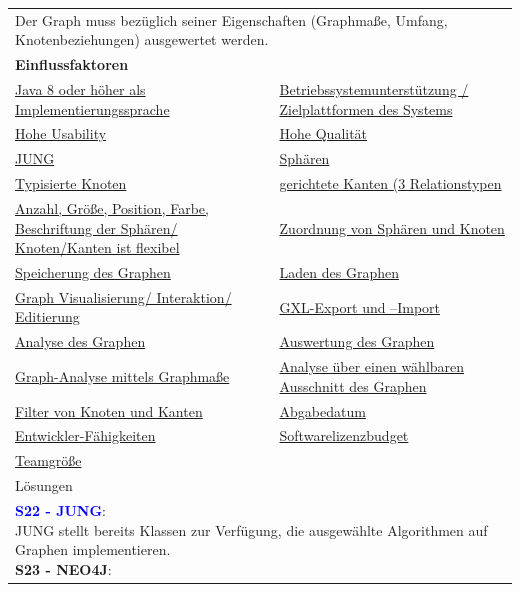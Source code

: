 \documentclass[enabledeprecatedfontcommands,fontsize=11pt,paper=a4,twoside]{scrartcl}
\newcommand{\cb}[1]{{\textcolor{blue}{#1}}}
\begin{document}
\newpage
\begin{tabular} {|p{8cm} p{8cm}|}
	\hline
	\rowcolor{prob}\multicolumn{2}{|l|}{\parbox{16cm}{\textbf{08: Auswertung von Grapheigenschaften}}} \\  \hline\hline 
	\multicolumn{2}{|l|}{\parbox{16cm}{Der Graph muss bezüglich seiner Eigenschaften (Graphmaße, Umfang, Knotenbeziehungen) ausgewertet werden.}}\rule{0pt}{4ex}\\ [1ex] \hline
	\multicolumn{2}{|l|}{\textbf{Einflussfaktoren}}\\
	\hyperlink{b}{Java 8 oder höher als Implementierungssprache} &
	\hyperlink {f}{Betriebssystemunterstützung / Zielplattformen des Systems}\\
	\hyperlink {g}{Hohe Usability}&
	\hyperlink {h}{Hohe Qualität}\\
	\hyperlink {k}{JUNG} &
	\hyperlink {n}{Sphären} \\
	\hyperlink {p}{Typisierte Knoten} &
	\hyperlink {q}{gerichtete Kanten (3 Relationstypen}\\
	\hyperlink {r}{Anzahl, Größe, Position, Farbe, Beschriftung der Sphären/ Knoten/Kanten ist flexibel} &
	\hyperlink {t}{Zuordnung von Sphären und Knoten} \\
	\hyperlink {v}{Speicherung des Graphen} &
	\hyperlink {w}{Laden des Graphen} \\
	\hyperlink {aa}{Graph Visualisierung/ Interaktion/ Editierung}&
	\hyperlink {jj}{GXL-Export und –Import} \\
	\hyperlink {oo}{Analyse des Graphen} &
	\hyperlink {pp}{Auswertung des Graphen} \\
	\hyperlink {qq}{Graph-Analyse mittels Graphmaße} &
	\hyperlink {rr}{Analyse über einen wählbaren Ausschnitt des Graphen} \\ 
	\hyperlink {ss}{Filter von Knoten und Kanten} &
	\hyperlink {uu}{Abgabedatum} \\
	\hyperlink {vv}{Entwickler-Fähigkeiten} &
	\hyperlink {ww}{Softwarelizenzbudget} \\
	\hyperlink {xx}{Teamgröße} &
	\\ \hline
	\multicolumn{2}{|l|}{Lösungen} \\
	\multicolumn{2}{|l|}{\parbox{16cm}{
			\textbf{\cb{\hypertarget{fff}{S22 - JUNG}}}: \\
			JUNG stellt bereits Klassen zur Verfügung, die ausgewählte Algorithmen auf Graphen implementieren. \\
			\textbf{S23 - NEO4J}: \\
}}
\end{tabular}
\end{document}
